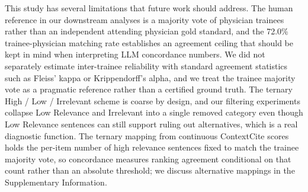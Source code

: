 \documentclass[fleqn,10pt]{wlscirep}
\begin{document}

This study has several limitations that future work should address. The human reference in our downstream analyses is a majority vote of physician trainees rather than an independent attending physician gold standard, and the 72.0\% trainee-physician matching rate establishes an agreement ceiling that should be kept in mind when interpreting LLM concordance numbers. We did not separately estimate inter-trainee reliability with standard agreement statistics such as Fleiss' kappa or Krippendorff's alpha, and we treat the trainee majority vote as a pragmatic reference rather than a certified ground truth. The ternary High / Low / Irrelevant scheme is coarse by design, and our filtering experiments collapse Low Relevance and Irrelevant into a single removed category even though Low Relevance sentences can still support ruling out alternatives, which is a real diagnostic function. The ternary mapping from continuous ContextCite scores holds the per-item number of high relevance sentences fixed to match the trainee majority vote, so concordance measures ranking agreement conditional on that count rather than an absolute threshold; we discuss alternative mappings in the Supplementary Information.
\end{document}
